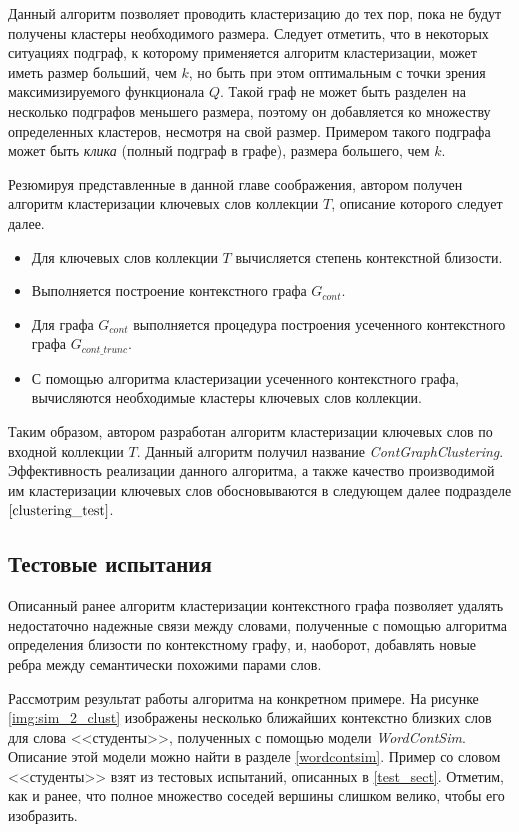 Данный алгоритм позволяет проводить кластеризацию до тех пор, пока не будут получены кластеры необходимого размера. Следует отметить, что в некоторых ситуациях подграф, к которому применяется алгоритм кластеризации, может иметь размер больший, чем $k$, но быть при этом оптимальным с точки зрения максимизируемого функционала $Q$. Такой граф не может быть разделен на несколько подграфов меньшего размера, поэтому он добавляется ко множеству определенных кластеров, несмотря на свой размер. Примером такого подграфа может быть \emph{клика} (полный подграф в графе), размера большего, чем $k$.

Резюмируя представленные в данной главе соображения, автором получен алгоритм кластеризации ключевых слов коллекции $T$, описание которого следует далее.  
\begin{itemize}
    \item Для ключевых слов коллекции $T$ вычисляется степень контекстной близости.
    \item Выполняется построение контекстного графа $G_{cont}$.
    \item Для графа $G_{cont}$ выполняется процедура построения усеченного контекстного графа $G_{cont\_trunc}$.
    \item С помощью алгоритма кластеризации усеченного контекстного графа, вычисляются необходимые кластеры ключевых слов коллекции.
\end{itemize}

Таким образом, автором разработан алгоритм кластеризации ключевых слов по входной коллекции $T$. Данный алгоритм получил название \emph{ContGraphClustering}. Эффективность реализации данного алгоритма, а также качество производимой им кластеризации ключевых слов обосновываются в следующем далее подразделе $\ref{clustering_test}$.
\subsection{Тестовые испытания} \label{clustering_test}

Описанный ранее алгоритм кластеризации контекстного графа позволяет удалять недостаточно надежные связи между словами, полученные с помощью алгоритма определения близости по контекстному графу, и, наоборот, добавлять новые ребра между семантически похожими парами слов. 

Рассмотрим результат работы алгоритма на конкретном примере. На рисунке \ref{img:sim_2_clust} изображены несколько ближайших контекстно близких слов для слова <<студенты>>, полученных с помощью модели \emph{WordContSim}. Описание этой модели можно найти в разделе \ref{wordcontsim}. Пример со словом <<студенты>> взят из тестовых испытаний, описанных в \ref{test_sect}. Отметим, как и ранее, что полное множество соседей вершины слишком велико, чтобы его изобразить.


